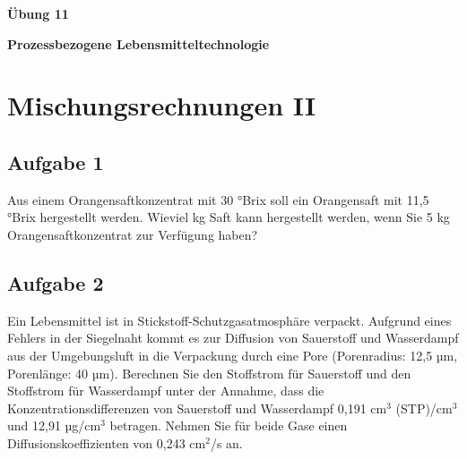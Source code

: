 \documentclass[a4paper,11pt]{article}
\newif\ifshowme
\begin{document}


\bckgrnd


\begin{center}
\LARGE
\color{white}
\textbf{Übung 11} \par \vspace*{2mm}
\large \color{miugray} \textbf{Prozessbezogene Lebensmitteltechnologie}
\end{center}
\par 
\vspace*{6mm}


\color{miudiutex}
\section*{Mischungsrechnungen II}

\subsection*{Aufgabe 1}
Aus einem Orangensaftkonzentrat mit 30 °Brix soll ein Orangensaft mit 11,5 °Brix hergestellt
werden. Wieviel kg Saft kann hergestellt werden, wenn Sie 5 kg Orangensaftkonzentrat zur
Verfügung haben?


\ifshowme
\antwort{
$m_1 = 5~\text{kg};~m_2 = m_1 + m_3 ;~m_3 = ~?~;~x_1=30~\text{°};~x_2=11,5~\text{°};~x_3=0~\text{°}$
\begin{align*}
m_1 \cdot x_1 + m_3 \cdot x_3 &= m_2 \cdot x_2 \\
m_1 \cdot x_1 + m_3 \cdot x_3 &= m_1 \cdot x_2 + m_3 \cdot x_2 \\
m_1 \cdot x_1 + m_3 \cdot x_3 - m_1 \cdot x_2 &= m_3 \cdot x_2 \\
m_1 \cdot x_1 - m_1 \cdot x_2 &= m_3 \cdot x_2 - m_3 \cdot x_3\\
m_1 \cdot x_1 - m_1 \cdot x_2 &= m_3 \cdot (x_2 - x_3)\\
\frac{m_1 \cdot x_1 - m_1 \cdot x_2}{x_2 - x_3} &= m_3 = 8,04
\end{align*}
Wir können also zu unseren vorhandenen 5 kg Orangensaftkonzentrat weitere 8,04 kg Wasser hinzugeben um einen °Brix von 11,5 zu erreichen. Dementsprechend erhalten wir 13,04 kg Orangensaft.

}
\else
\fi


\subsection*{Aufgabe 2}
Ein Lebensmittel ist in Stickstoff-Schutzgasatmosphäre verpackt. Aufgrund eines Fehlers in
der Siegelnaht kommt es zur Diffusion von Sauerstoff und Wasserdampf aus der
Umgebungsluft in die Verpackung durch eine Pore (Porenradius: 12,5 µm, Porenlänge: 40
µm). Berechnen Sie den Stoffstrom für Sauerstoff und den Stoffstrom für Wasserdampf unter
der Annahme, dass die Konzentrationsdifferenzen von Sauerstoff und Wasserdampf 0,191 cm$^3$ (STP)/cm$^3$ und 12,91 µg/cm$^3$ betragen. Nehmen Sie für beide Gase einen Diffusionskoeffizienten von 0,243 cm$^2$/s an. 
\end{document}
